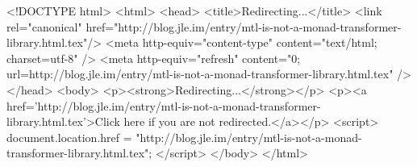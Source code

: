 <!DOCTYPE html>
<html>
<head>
<title>Redirecting...</title>
<link rel="canonical" href="http://blog.jle.im/entry/mtl-is-not-a-monad-transformer-library.html.tex"/>
<meta http-equiv="content-type" content="text/html; charset=utf-8" />
<meta http-equiv="refresh" content="0; url=http://blog.jle.im/entry/mtl-is-not-a-monad-transformer-library.html.tex" />
</head>
<body>
  <p><strong>Redirecting...</strong></p>
  <p><a href='http://blog.jle.im/entry/mtl-is-not-a-monad-transformer-library.html.tex'>Click here if you are not redirected.</a></p>
  <script>
    document.location.href = "http://blog.jle.im/entry/mtl-is-not-a-monad-transformer-library.html.tex";
  </script>
</body>
</html>
